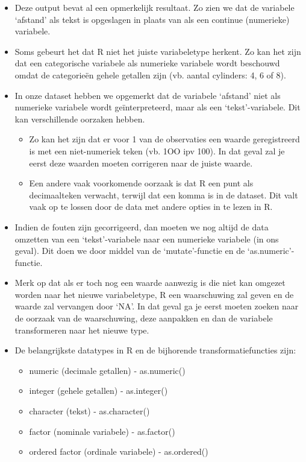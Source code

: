 \documentclass[]{tufte-book}
\providecommand{\tightlist}{%
  \setlength{\itemsep}{0pt}\setlength{\parskip}{0pt}}
\begin{document}
\begin{itemize}
\item
  Deze output bevat al een opmerkelijk resultaat. Zo zien we dat de variabele `afstand' als tekst is opgeslagen in plaats van als een continue (numerieke) variabele.
\item
  Soms gebeurt het dat R niet het juiste variabeletype herkent. Zo kan het zijn dat een categorische variabele als numerieke variabele wordt beschouwd omdat de categorieën gehele getallen zijn (vb. aantal cylinders: 4, 6 of 8).
\item
  In onze dataset hebben we opgemerkt dat de variabele `afstand' niet als numerieke variabele wordt geïnterpreteerd, maar als een `tekst'-variabele. Dit kan verschillende oorzaken hebben.

  \begin{itemize}
  \tightlist
  \item
    Zo kan het zijn dat er voor 1 van de observaties een waarde geregistreerd is met een niet-numeriek teken (vb. 1OO ipv 100). In dat geval zal je eerst deze waarden moeten corrigeren naar de juiste waarde.
  \item
    Een andere vaak voorkomende oorzaak is dat R een punt als decimaalteken verwacht, terwijl dat een komma is in de dataset. Dit valt vaak op te lossen door de data met andere opties in te lezen in R.
  \end{itemize}
\item
  Indien de fouten zijn gecorrigeerd, dan moeten we nog altijd de data omzetten van een `tekst'-variabele naar een numerieke variabele (in ons geval). Dit doen we door middel van de `mutate'-functie en de `as.numeric'-functie.
\item
  Merk op dat als er toch nog een waarde aanwezig is die niet kan omgezet worden naar het nieuwe variabeletype, R een waarschuwing zal geven en de waarde zal vervangen door `NA'. In dat geval ga je eerst moeten zoeken naar de oorzaak van de waarschuwing, deze aanpakken en dan de variabele transformeren naar het nieuwe type.
\item
  De belangrijkste datatypes in R en de bijhorende transformatiefuncties zijn:

  \begin{itemize}
  \tightlist
  \item
    numeric (decimale getallen) - as.numeric()
  \item
    integer (gehele getallen) - as.integer()
  \item
    character (tekst) - as.character()
  \item
    factor (nominale variabele) - as.factor()
  \item
    ordered factor (ordinale variabele) - as.ordered()
  \end{itemize}
\end{itemize}
\end{document}

